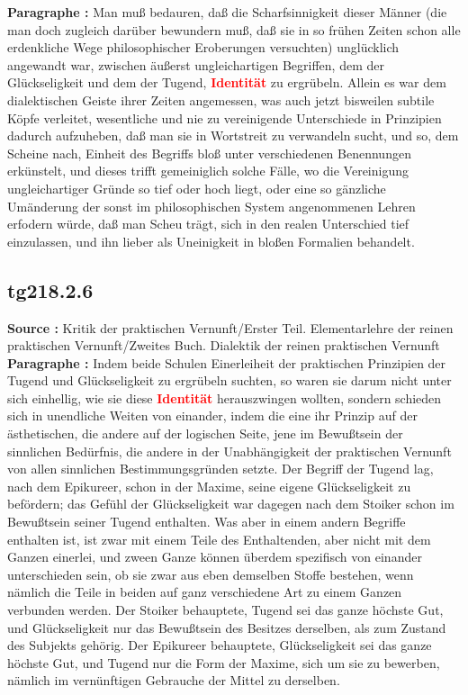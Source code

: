 \documentclass[a4paper,12pt,twoside]{book}
\newcommand{\match}[1]{\textcolor{red}{\textbf{#1}}}
\begin{document}
	\noindent\textbf{Paragraphe : }Man muß bedauren, daß die Scharfsinnigkeit dieser Männer (die man doch zugleich darüber bewundern muß, daß sie in so frühen Zeiten schon alle erdenkliche Wege philosophischer Eroberungen versuchten) unglücklich angewandt war, zwischen äußerst ungleichartigen Begriffen, dem der Glückseligkeit und dem der Tugend, \match{Identität} zu ergrübeln. Allein es war dem dialektischen Geiste ihrer Zeiten angemessen, was auch jetzt bisweilen subtile Köpfe verleitet, wesentliche und nie zu vereinigende Unterschiede in Prinzipien dadurch aufzuheben, daß man sie in Wortstreit zu verwandeln sucht, und so, dem Scheine nach, Einheit des Begriffs bloß unter verschiedenen Benennungen erkünstelt, und dieses trifft gemeiniglich solche Fälle, wo die Vereinigung ungleichartiger Gründe so tief oder hoch liegt, oder eine so gänzliche Umänderung der sonst im philosophischen System angenommenen Lehren erfodern würde, daß man Scheu trägt, sich in den realen Unterschied tief einzulassen, und ihn lieber als Uneinigkeit in bloßen Formalien behandelt. 
	
	\subsection*{tg218.2.6} 
	\textbf{Source : }Kritik der praktischen Vernunft/Erster Teil. Elementarlehre der reinen praktischen Vernunft/Zweites Buch. Dialektik der reinen praktischen Vernunft\\  
	
	\noindent\textbf{Paragraphe : }Indem beide Schulen Einerleiheit der praktischen Prinzipien der Tugend und Glückseligkeit zu ergrübeln suchten, so waren sie darum nicht unter sich einhellig, wie sie diese \match{Identität} herauszwingen wollten, sondern schieden sich in unendliche Weiten von einander, indem die eine ihr Prinzip auf der ästhetischen, die andere auf der logischen Seite, jene im Bewußtsein der sinnlichen Bedürfnis, die andere in der Unabhängigkeit der praktischen Vernunft von allen sinnlichen Bestimmungsgründen setzte. Der Begriff der Tugend lag, nach dem Epikureer, schon in der Maxime, seine eigene Glückseligkeit zu befördern; das Gefühl der Glückseligkeit war dagegen nach dem Stoiker schon im Bewußtsein seiner Tugend enthalten. Was aber in einem andern Begriffe enthalten ist, ist zwar mit einem Teile des Enthaltenden, aber nicht mit dem Ganzen einerlei, und zween Ganze können überdem spezifisch von einander unterschieden sein, ob sie zwar aus eben demselben Stoffe bestehen, wenn nämlich die Teile in beiden auf ganz verschiedene Art zu einem  Ganzen verbunden werden. Der Stoiker behauptete, Tugend sei das ganze höchste Gut, und Glückseligkeit nur das Bewußtsein des Besitzes derselben, als zum Zustand des Subjekts gehörig. Der Epikureer behauptete, Glückseligkeit sei das ganze höchste Gut, und Tugend nur die Form der Maxime, sich um sie zu bewerben, nämlich im vernünftigen Gebrauche der Mittel zu derselben. 
	
\end{document}
